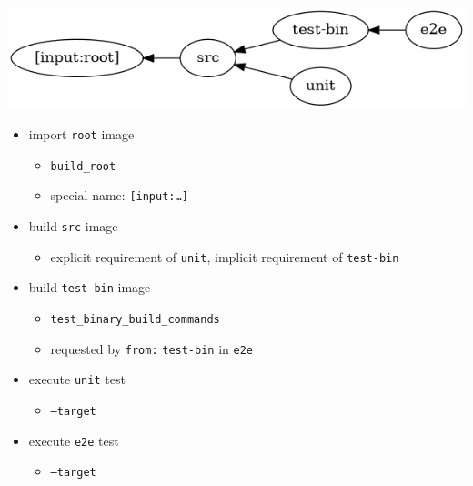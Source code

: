 \begin{frame}
    \autotitle
    \begin{center}
        \includegraphics[scale=0.5]{img/graph.png}
    \end{center}
    \setlength\linewidth{40em}
    \setlength\columnsep{0cm}
    \begin{multicols}{2}
        \begin{itemize}
            \item import \texttt{root} image
                \begin{itemize}
                    \item \texttt{build\_root}
                    \item special name: \texttt{[input:…]}
                \end{itemize}
            \item build \texttt{src} image
                \begin{itemize}
                    \item
                        explicit requirement of \texttt{unit}, implicit
                        requirement of \texttt{test-bin}
                \end{itemize}
            \item build \texttt{test-bin} image
                \begin{itemize}
                    \item \texttt{test\_binary\_build\_commands}
                    \item
                        requested by \texttt{from:} \texttt{test-bin} in
                        \texttt{e2e}
                \end{itemize}
            \columnbreak
            \item execute \texttt{unit} test
                \begin{itemize}
                    \item \texttt{--target}
                \end{itemize}
            \item execute \texttt{e2e} test
                \begin{itemize}
                    \item \texttt{--target}
                \end{itemize}
        \end{itemize}
    \end{multicols}
\end{frame}

